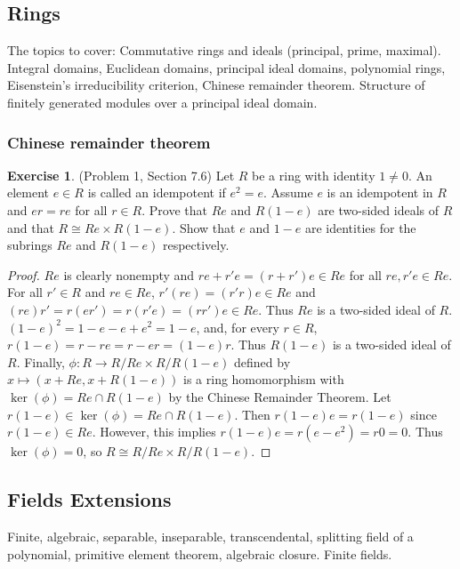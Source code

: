 \documentclass[12pt, psamsfonts]{amsart}
\theoremstyle{definition}
\newtheorem*{exer}{Exercise}
\theoremstyle{remark}
\numberwithin{equation}{section}
\begin{document}
\subsection{Rings}
The topics to cover: Commutative rings and ideals (principal, prime, maximal).
Integral domains, Euclidean domains, principal ideal domains, polynomial rings, Eisenstein's irreducibility criterion, Chinese remainder theorem.
Structure of finitely generated modules over a principal ideal domain.

\subsubsection{Chinese remainder theorem}

\begin{exer}{(Problem 1, Section 7.6)}
  Let $R$ be a ring with identity $1 \ne 0$.
  An element $e \in R$ is called an idempotent if $e^2 = e$.
  Assume $e$ is an idempotent in $R$ and $er = re$ for all $r \in R$.
  Prove that $Re$ and $R(1 - e)$ are two-sided ideals of $R$ and that $R \cong Re \times R(1 - e)$.
  Show that $e$ and $1 - e$ are identities for the subrings $Re$ and $R(1 - e)$ respectively.
\end{exer}

\begin{proof}
  $Re$ is clearly nonempty and $re + r'e = (r + r')e \in Re$ for all $re, r'e \in Re$.
  For all $r' \in R$ and $re \in Re$, $r'(re) = (r'r)e \in Re$ and $(re)r' = r(er') = r(r'e) = (rr')e \in Re$.
  Thus $Re$ is a two-sided ideal of $R$.
  $(1 - e)^2 = 1 - e - e + e^2 = 1 - e$, and, for every $r \in R$, $r(1 - e) = r - re = r - er = (1 - e)r$.
  Thus $R(1 - e)$ is a two-sided ideal of $R$.
  Finally, $\phi: R \rightarrow R / Re \times R / R(1 - e)$ defined by $x \mapsto (x + Re, x + R(1 - e))$ is a ring homomorphism with $\ker(\phi) = Re \cap R(1 - e)$ by the Chinese Remainder Theorem.
  Let $r(1 - e) \in \ker(\phi) = Re \cap R(1 - e)$.
  Then $r(1 - e)e = r(1 - e)$ since $r(1 - e) \in Re$.
  However, this implies $r(1 - e)e = r(e - e^2) = r0 = 0$.
  Thus $\ker(\phi) = 0$, so $R \cong R / Re \times R / R(1 - e)$.
\end{proof}


\subsection{Fields Extensions}
Finite, algebraic, separable, inseparable, transcendental, splitting field of a polynomial, primitive element theorem, algebraic closure.
Finite fields.
\end{document}
